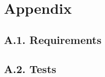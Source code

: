 \documentclass[11pt]{report}
\begin{document}

{}



\appendix

\chapter{Appendix}

\section{A.1. Requirements}

\section{A.2. Tests}
\end{document}
